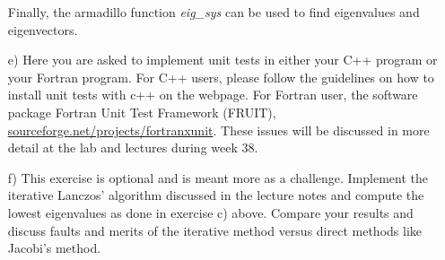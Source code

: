 \documentclass[11pt,a4wide]{article}
\begin{document}
\begin{enumerate}
Finally, the armadillo function {\em eig\_sys} can be used to find eigenvalues and eigenvectors.



\item[e)]  
Here you are asked to implement unit tests in either your C++ program or your Fortran program. For C++ users, please follow the guidelines on how to install
unit tests with c++ on the webpage. For Fortran user, the software package Fortran Unit Test Framework (FRUIT), \url{sourceforge.net/projects/fortranxunit}. These issues will be discussed in more detail at the lab and lectures during week 38. 

\item[f)]  This exercise is optional and is meant more as a challenge. 
Implement the iterative Lanczos' algorithm discussed in the lecture notes and compute the lowest eigenvalues 
as done in exercise c) above. Compare your results and discuss faults and merits of the iterative method versus
direct methods like Jacobi's method. 
\end{enumerate}
\end{document}
